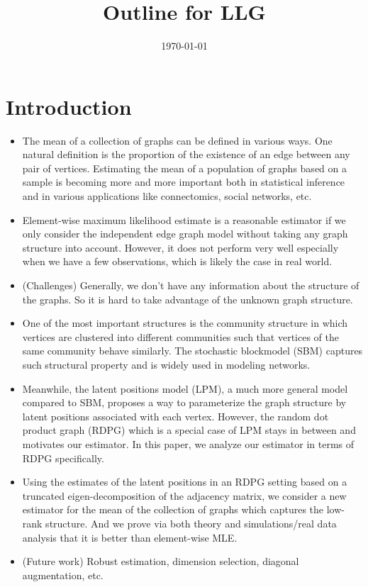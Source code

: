 \documentclass[a4paper]{article}
\title{Outline for LLG}
\date{\today}
\begin{document}
\maketitle

\section{Introduction}

\begin{itemize}
\item The mean of a collection of graphs can be defined in various ways. One natural definition is the proportion of the existence of an edge between any pair of vertices. Estimating the mean of a population of graphs based on a sample is becoming more and more important both in statistical inference and in various applications like connectomics, social networks, etc.
\item Element-wise maximum likelihood estimate is a reasonable estimator if we only consider the independent edge graph model without taking any graph structure into account. However, it does not perform very well especially when we have a few observations, which is likely the case in real world.
\item (Challenges) Generally, we don't have any information about the structure of the graphs. So it is hard to take advantage of the unknown graph structure.
\item One of the most important structures is the community structure in which vertices are clustered into different communities such that vertices of the same community behave similarly. The stochastic blockmodel (SBM) captures such structural property and is widely used in modeling networks.
\item Meanwhile, the latent positions model (LPM), a much more general model compared to SBM, proposes a way to parameterize the graph structure by latent positions associated with each vertex. However, the random dot product graph (RDPG) which is a special case of LPM stays in between and motivates our estimator. In this paper, we analyze our estimator in terms of RDPG specifically.
\item Using the estimates of the latent positions in an RDPG setting based on a truncated eigen-decomposition of the adjacency matrix, we consider a new estimator for the mean of the collection of graphs which captures the low-rank structure. And we prove via both theory and simulations/real data analysis that it is better than element-wise MLE.
\item (Future work) Robust estimation, dimension selection, diagonal augmentation, etc.
\end{itemize}
\end{document}
